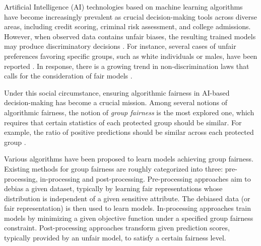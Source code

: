 \documentclass[10pt]{article} %
\begin{document}
Artificial Intelligence (AI) technologies based on machine learning algorithms have become increasingly prevalent as crucial decision-making tools across diverse areas, including credit scoring, criminal risk assessment, and college admissions.
However, when observed data contains unfair biases, the resulting trained models may produce discriminatory decisions \citep{calders2009building, feldman2015certifying, angwin2016machine, barocas2016big, https://doi.org/10.48550/arxiv.1610.07524, kleinberg2018algorithmic, mehrabi2019survey, https://doi.org/10.48550/arxiv.2111.11665}. 
For instance, several cases of unfair preferences favoring specific groups, such as white individuals or males, have been reported \citep{angwin2016machine, ingold2016amazon, Dua:2019}.
In response, there is a growing trend in non-discrimination laws that calls for the consideration of fair models \citep{Hellman2019MeasuringAF}.

Under this social circumstance, ensuring algorithmic fairness in AI-based decision-making has become a crucial mission.
Among several notions of algorithmic fairness, the notion of \textit{group fairness} is the most explored one, which requires that certain statistics of each protected group should be similar.
For example, the ratio of positive predictions should be similar across each protected group \citep{calders2009building, barocas2016big, zafar2017fairness, donini2018empirical, pmlr-v80-agarwal18a}.

Various algorithms have been proposed to learn models achieving group fairness. 
Existing methods for group fairness are roughly categorized into three: pre-processing, in-processing and post-processing.
Pre-processing approaches \citep{pmlr-v28-zemel13, feldman2015certifying, webster2018mind, xu2018fairgan, Madras2018LearningAF, creager2019flexibly, pmlr-v162-kim22b} aim to debias a given dataset, typically by learning fair representations whose distribution is independent of a given sensitive attribute.
The debiased data (or fair representation) is then used to learn models.
In-processing approaches \citep{kamishima2012fairness, goh2016satisfying, zafar2017fairness, pmlr-v80-agarwal18a, onconvexand, Cotter2019TwoPlayerGF, celis2019classification, zafar2019fairness, jiang2020wasserstein, KIM2022441} train models by minimizing a given objective function under a specified group fairness constraint.
Post-processing approaches \citep{kamiran2012decision, hardt2016equality, fish2016confidence, corbett2017algorithmic, pleiss2017fairness, chzhen2019leveraging, wei20a, jiang2020wasserstein} transform given prediction scores, typically provided by an unfair model, to satisfy a certain fairness level.
\end{document}
